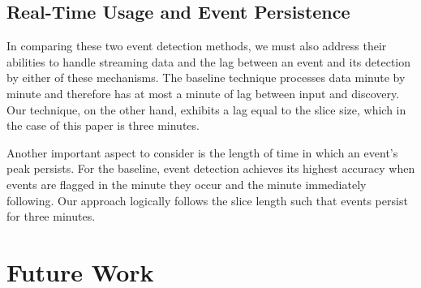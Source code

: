 \documentclass{sig-alternate}
\begin{document}
\subsection{Real-Time Usage and Event Persistence}

In comparing these two event detection methods, we must also address their abilities to handle streaming data and the lag between an event and its detection by either of these mechanisms.
The baseline technique processes data minute by minute and therefore has at most a minute of lag between input and discovery.
Our technique, on the other hand, exhibits a lag equal to the slice size, which in the case of this paper is three minutes.

Another important aspect to consider is the length of time in which an event's peak persists.
For the baseline, event detection achieves its highest accuracy when events are flagged in the minute they occur and the minute immediately following.
Our approach logically follows the slice length such that events persist for three minutes.

\section{Future Work}
\label{sect:future}
\end{document}
